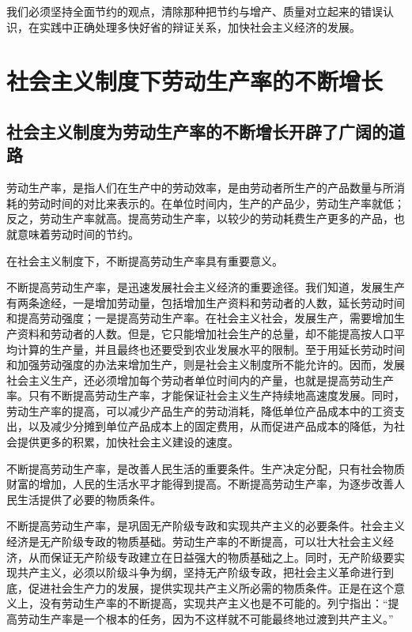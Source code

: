 \documentclass{book}
\begin{document}
我们必须坚持全面节约的观点，清除那种把节约与增产、质量对立起来的错误认识，在实践中正确处理多快好省的辩证关系，加快社会主义经济的发展。

\section{社会主义制度下劳动生产率的不断增长}

\subsection{社会主义制度为劳动生产率的不断增长开辟了广阔的道路}

劳动生产率，是指人们在生产中的劳动效率，是由劳动者所生产的产品数量与所消耗的劳动时间的对比来表示的。在单位时间内，生产的产品少，劳动生产率就低；反之，劳动生产率就高。提高劳动生产率，以较少的劳动耗费生产更多的产品，也就意味着劳动时间的节约。

在社会主义制度下，不断提高劳动生产率具有重要意义。

不断提高劳动生产率，是迅速发展社会主义经济的重要途径。我们知道，发展生产有两条途经，一是增加劳动量，包括增加生产资料和劳动者的人数，延长劳动时间和提高劳动强度；一是提高劳动生产率。在社会主义社会，发展生产，需要增加生产资料和劳动者的人数。但是，它只能增加社会生产的总量，却不能提高按人口平均计算的生产量，并且最终也还要受到农业发展水平的限制。至于用延长劳动时间和加强劳动强度的办法来增加生产，则是社会主义制度所不能允许的。因而，发展社会主义生产，还必须增加每个劳动者单位时间内的产量，也就是提高劳动生产率。只有不断提高劳动生产率，才能保证社会主义生产持续地高速度发展。同时，劳动生产率的提高，可以减少产品生产的劳动消耗，降低单位产品成本中的工资支出，以及减少分摊到单位产品成本上的固定费用，从而促进产品成本的降低，为社会提供更多的积累，加快社会主义建设的速度。

不断提高劳动生产率，是改善人民生活的重要条件。生产决定分配，只有社会物质财富的增加，人民的生活水平才能得到提高。不断提高劳动生产率，为逐步改善人民生活提供了必要的物质条件。

不断提高劳动生产率，是巩固无产阶级专政和实现共产主义的必要条件。社会主义经济是无产阶级专政的物质基础。劳动生产率的不断提高，可以壮大社会主义经济，从而保证无产阶级专政建立在日益强大的物质基础之上。同时，无产阶级要实现共产主义，必须以阶级斗争为纲，坚持无产阶级专政，把社会主义革命进行到底，促进社会生产力的发展，提供实现共产主义所必需的物质条件。正是在这个意义上，没有劳动生产率的不断提高，实现共产主义也是不可能的。列宁指出：“提高劳动生产率是一个根本的任务，因为不这样就不可能最终地过渡到共产主义。”
\end{document}
